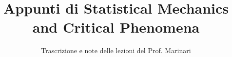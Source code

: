 \documentclass[a4paper,12pt]{article}
\title{Appunti di Statistical Mechanics and Critical Phenomena}
\author{Trascrizione e note delle lezioni del Prof. Marinari}
\date{}
\begin{document}
\maketitle
\projectintro
\tableofcontents
\newpage

% 
% 
% 
% 
% 
\end{document}
